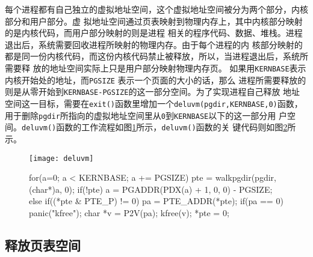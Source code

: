 \documentclass{swfuthesism}
\begin{document}
每个进程都有自己独立的虚拟地址空间，这个虚拟地址空间被分为两个部分，内核部分和用户部分。虚
拟地址空间通过页表映射到物理内存上，其中内核部分映射的是内核代码，而用户部分映射的则是进程
相关的程序代码、数据、堆栈。进程退出后，系统需要回收进程所映射的物理内存。由于每个进程的内
核部分映射的都是同一份内核代码，而这份内核代码禁止被释放，所以，当进程退出后，系统所需要释
放的地址空间实际上只是用户部分映射物理内存页。
如果用\texttt{KERNBASE}表示内核开始处的地址，而\texttt{PGSIZE} 表示一个页面的大小的话，那么
进程所需要释放的则是从零开始到\texttt{KERNBASE-PGSIZE}的这一部分空间。为了实现进程自己释放
地址空间这一目标，需要在\texttt{exit()}函数里增加一个\texttt{deluvm(pgdir,KERNBASE,0)}函数，
用于删除\texttt{pgdir}所指向的虚拟地址空间里从\texttt{0}到\texttt{KERNBASE}以下的这一部分用
户空间。\texttt{deluvm()}函数的工作流程如图\ref{fig:deluvm}所示，\texttt{deluvm()}函数的关
键代码则如图\ref{fig:lst:deluvmcode}所示。

\begin{figure}
  \centering \texttt{[image: deluvm]}
  \label{fig:deluvm}
\end{figure}

\begin{figure}
  \begin{codeblock}
\begin{ccode}
for(a=0; a < KERNBASE; a += PGSIZE)
{
  pte = walkpgdir(pgdir, (char*)a, 0);
  if(!pte)
    a = PGADDR(PDX(a) + 1, 0, 0) - PGSIZE;
  else if((*pte & PTE_P) != 0){
    pa = PTE_ADDR(*pte);
    if(pa == 0)
      panic("kfree");
    char *v = P2V(pa);
    kfree(v);
    *pte = 0;
  }
}
\end{ccode}
  \end{codeblock}
  \label{fig:lst:deluvmcode}
\end{figure}

\subsection{释放页表空间}
\end{document}
